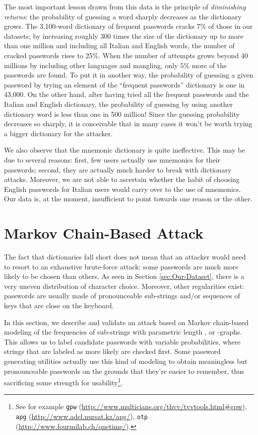 \documentclass[a4paper,twocolumn]{article}
\begin{document}
The most important lesson drawn from this data is the principle of
\emph{diminishing returns}: the probability of guessing a word sharply
decreases as the dictionary grows. The 3,100-word dictionary of frequent
passwords cracks 7\% of those in our datasets; by increasing roughly
300 times the size of the dictionary up to more than one million and
including all Italian and English words, the number of cracked passwords
rises to 25\%. When the number of attempts grows beyond 40 millions
by including other languages and mangling, only 5\% more of the passwords
are found. To put it in another way, the probability of guessing a
given password by trying an element of the {}``frequent passwords''
dictionary is one in 43,000. On the other hand, after having tried
all the frequent passwords and the Italian and English dictionary,
the probability of guessing by using another dictionary word is less
than one in 500 million! Since the guessing probability decreases
so sharply, it is conceivable that in many cases it won't be worth
trying a bigger dictionary for the attacker.

We also observe that the mnemonic dictionary is quite ineffective.
This may be due to several reasons: first, few users actually use
mnemonics for their passwords; second, they are actually much harder
to break with dictionary attacks. Moreover, we are not able to ascertain
whether the habit of choosing English passwords for Italian users
would carry over to the use of mnemonics. Our data is, at the moment,
insufficient to point towards one reason or the other.


\section{Markov Chain-Based Attack}

\label{sec:Markov-Chain-Based-Attack}The fact that dictionaries fall
short does not mean that an attacker would need to resort to an exhaustive
brute-force attack: some passwords are much more likely to be chosen
than others. As seen in Section \ref{sec:Our-Dataset}, there is a
very uneven distribution of character choice. Moreover, other regularities
exist: passwords are usually made of pronounceable sub-strings and/or
sequences of keys that are close on the keyboard.

In this section, we describe and validate an attack based on Markov
chain-based modeling of the frequencies of sub-strings with parametric
length , or -graphs. This allows us to label candidate passwords
with variable probabilities, where strings that are labeled as more
likely are checked first. Some password generating utilities actually
use this kind of modeling to obtain meaningless but pronounceable
passwords on the grounds that they're easier to remember, thus sacrificing
some strength for usability\footnote{See for example \texttt{gpw} (\url{http://www.multicians.org/thvv/tvvtools.html#gpw}),
\texttt{apg} (\url{http://www.adel.nursat.kz/apg/}), \texttt{otp}
(\url{http://www.fourmilab.ch/onetime/}).}.
\end{document}
